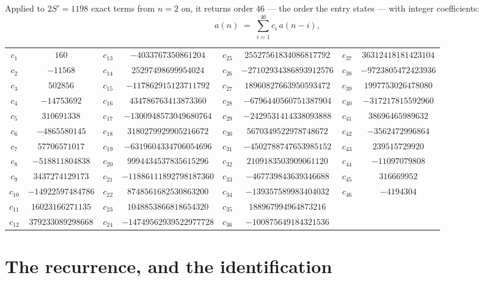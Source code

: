 \documentclass[11pt,a4paper]{article}
\theoremstyle{plain}
\theoremstyle{definition}
\begin{document}
Applied to $2S'=1198$ exact terms from $n=2$ on, it returns order $46$ --- the
order the entry states --- with integer coefficients:
\[
a(n)\;=\;\sum_{i=1}^{46}c_i\,a(n-i),
\]
\begin{center}\small
\begin{tabular}{cccccccc}
$c_{1}$ & $160$ & $c_{13}$ & $-4033767350861204$ & $c_{25}$ & $25527561834086817792$ & $c_{37}$ & $36312418181423104$ \\
$c_{2}$ & $-11568$ & $c_{14}$ & $25297498699954024$ & $c_{26}$ & $-27102934386893912576$ & $c_{38}$ & $-9723805472423936$ \\
$c_{3}$ & $502856$ & $c_{15}$ & $-117862915123711792$ & $c_{27}$ & $18960827663950593472$ & $c_{39}$ & $1997753026478080$ \\
$c_{4}$ & $-14753692$ & $c_{16}$ & $434786763413873360$ & $c_{28}$ & $-6796440560751387904$ & $c_{40}$ & $-317217815592960$ \\
$c_{5}$ & $310691338$ & $c_{17}$ & $-1300948573049680764$ & $c_{29}$ & $-2429531414338093888$ & $c_{41}$ & $38696465989632$ \\
$c_{6}$ & $-4865580145$ & $c_{18}$ & $3180279929905216672$ & $c_{30}$ & $5670349522978748672$ & $c_{42}$ & $-3562472996864$ \\
$c_{7}$ & $57706571017$ & $c_{19}$ & $-6319604334706054696$ & $c_{31}$ & $-4502788747653985152$ & $c_{43}$ & $239515729920$ \\
$c_{8}$ & $-518811804838$ & $c_{20}$ & $9994434537835615296$ & $c_{32}$ & $2109183503909061120$ & $c_{44}$ & $-11097079808$ \\
$c_{9}$ & $3437274129173$ & $c_{21}$ & $-11886111892798187360$ & $c_{33}$ & $-467739843639346688$ & $c_{45}$ & $316669952$ \\
$c_{10}$ & $-14922597484786$ & $c_{22}$ & $8748561682530863200$ & $c_{34}$ & $-139357589983404032$ & $c_{46}$ & $-4194304$ \\
$c_{11}$ & $16023166271135$ & $c_{23}$ & $1048853866818654320$ & $c_{35}$ & $188967994964873216$ &  &  \\
$c_{12}$ & $379233089298668$ & $c_{24}$ & $-14749562939522977728$ & $c_{36}$ & $-100875649184321536$ &  &  \\
\end{tabular}
\end{center}

\section{The recurrence, and the identification}
\end{document}
